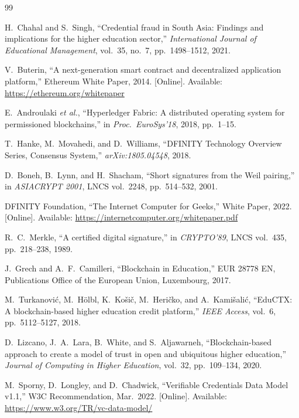 \documentclass[conference]{IEEEtran}
\begin{document}
\balance
\begin{thebibliography}{99}

H.~Chahal and S.~Singh,
``Credential fraud in South Asia: Findings and implications for the higher education sector,''
\textit{International Journal of Educational Management}, vol.~35, no.~7, pp.~1498--1512, 2021.

V.~Buterin,
``A next-generation smart contract and decentralized application platform,''
Ethereum White Paper, 2014.
[Online]. Available: \url{https://ethereum.org/whitepaper}

E.~Androulaki \textit{et al.},
``Hyperledger Fabric: A distributed operating system for permissioned blockchains,''
in \textit{Proc.\ EuroSys'18}, 2018, pp.~1--15.

T.~Hanke, M.~Movahedi, and D.~Williams,
``DFINITY Technology Overview Series, Consensus System,''
\textit{arXiv:1805.04548}, 2018.

D.~Boneh, B.~Lynn, and H.~Shacham,
``Short signatures from the Weil pairing,''
in \textit{ASIACRYPT 2001}, LNCS vol.~2248, pp.~514--532, 2001.

DFINITY Foundation,
``The Internet Computer for Geeks,''
White Paper, 2022.
[Online]. Available: \url{https://internetcomputer.org/whitepaper.pdf}

R.~C.~Merkle,
``A certified digital signature,''
in \textit{CRYPTO'89}, LNCS vol.~435, pp.~218--238, 1989.

J.~Grech and A.~F.~Camilleri,
``Blockchain in Education,''
EUR 28778 EN, Publications Office of the European Union, Luxembourg, 2017.

M.~Turkanovi\'{c}, M.~H\"{o}lbl, K.~Ko\v{s}i\v{c}, M.~Heri\v{c}ko, and A.~Kami\v{s}ali\'{c},
``EduCTX: A blockchain-based higher education credit platform,''
\textit{IEEE Access}, vol.~6, pp.~5112--5127, 2018.

D.~Lizcano, J.~A.~Lara, B.~White, and S.~Aljawarneh,
``Blockchain-based approach to create a model of trust in open and ubiquitous higher education,''
\textit{Journal of Computing in Higher Education}, vol.~32, pp.~109--134, 2020.

M.~Sporny, D.~Longley, and D.~Chadwick,
``Verifiable Credentials Data Model v1.1,''
W3C Recommendation, Mar.~2022.
[Online]. Available: \url{https://www.w3.org/TR/vc-data-model/}


\end{thebibliography}
\end{document}
